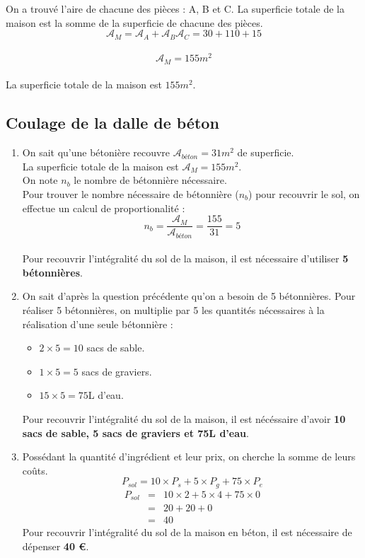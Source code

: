 \documentclass[11pt]{article}
\begin{document}
On a trouvé l'aire de chacune des pièces : A, B et C. La superficie totale de la maison est la somme de la superficie de chacune des pièces.\\
$$ \mathcal{A}_{M} = \mathcal{A}_{A} + \mathcal{A}_{B} \mathcal{A}_{C} = 30 + 110 + 15$$\\
$$ \mathcal{A}_{M} = 155 m^2$$\\

La superficie totale de la maison est $155m^2$.

\subsection{Coulage de la dalle de béton}


\begin{enumerate}
\item On sait qu'une bétonière recouvre $\mathcal{A}_{béton} = 31m^2$ de superficie.\\
  La superficie totale de la maison est $\mathcal{A}_{M} = 155 m^2$.\\
  On note $n_b$ le nombre de bétonnière nécessaire.\\
  Pour trouver le nombre nécessaire de bétonnière ($n_b$) pour recouvrir le sol, on effectue un calcul de proportionalité :\\
  
  $$n_b = \frac{\mathcal{A}_M}{\mathcal{A}_{béton}} = \frac{155}{31} = 5$$\\
  
  Pour recouvrir l'intégralité du sol de la maison, il est nécessaire d'utiliser \textbf{5 bétonnières}.

\item On sait d'après la question précédente qu'on a besoin de 5 bétonnières. Pour réaliser 5 bétonnières, on multiplie par 5 les quantités nécessaires à la réalisation d'une seule bétonnière :
  \begin{itemize}
  \item $2 \times 5 = 10$ sacs de sable.
  \item $1 \times 5 = 5$ sacs de graviers.
  \item $15 \times 5 = 75$L d'eau.
  \end{itemize}
  
  Pour recouvrir l'intégralité du sol de la maison, il est nécéssaire d'avoir \textbf{10 sacs de sable, 5 sacs de graviers et 75L d'eau}.

\item Possédant la quantité d'ingrédient et leur prix, on cherche la somme de leurs coûts. \\
  $$P_{sol} = 10 \times P_s + 5 \times P_g + 75 \times P_e$$
  \begin{eqnarray*}
    P_{sol} & = & 10 \times 2 + 5 \times 4 + 75 \times 0\\
    & = & 20 + 20 + 0\\
    & = & 40
  \end{eqnarray*}
  Pour recouvrir l'intégralité du sol de la maison en béton, il est nécessaire de dépenser \textbf{40 \euro}.
\end{enumerate} %
\end{document}
